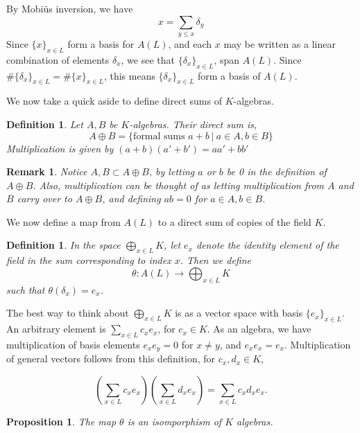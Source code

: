 \documentclass[11pt]{article}
\newtheorem{proposition}[theorem]{Proposition}
\newtheorem{definition}[theorem]{Definition}
\newtheorem{remark}[theorem]{Remark}
\begin{document}
By Mobi\"{u}s inversion, we have 
$$x=\sum_{y\le x} \delta_y$$
Since $\{x\}_{x\in L}$ form a basis for $A(L)$, and each $x$ may be written as a linear combination of elements $\delta_x$, we see that $\{\delta_x\}_{x\in L}$, span $A(L)$. Since $\#\{\delta_x\}_{x\in L}=\#\{x\}_{x\in L}$, this means $\{\delta_x\}_{x\in L}$ form a basis of $A(L)$. 

We now take a quick aside to define direct sums of $K$-algebras.

\begin{definition}
Let $A,B$ be $K$-algebras. Their direct sum is,
$$A\oplus B=\{\mbox{formal sums } a+b \: | \: a\in A, b \in B\}$$
Multiplication is given by $(a+b)(a'+b')=aa'+bb'$
\end{definition}

\begin{remark}
Notice $A,B\subset A\oplus B$, by letting $a$ or $b$ be 0 in the definition of $A\oplus B$. Also, multiplication can be thought of as letting multiplication from $A$ and $B$ carry over to $A\oplus B$, and defining $ab=0$ for $a\in A, b\in B$.
\end{remark}

We now define a map from $A(L)$ to a direct sum of copies of the field $K$.

\begin{definition}
In the space $\bigoplus_{x\in L} K$, let $e_x$ denote the identity element of the field in the sum corresponding to index $x$. Then we define 
$$\theta: A(L) \rightarrow \bigoplus_{x\in L} K$$
such that $\theta(\delta_x)=e_x$.
\end{definition}

The best way to think about $\bigoplus_{x\in L} K$ is as a vector space with basis $\{e_x\}_{x\in L}$. An arbitrary element is $\sum_{x \in L} c_x e_x$, for $c_x\in K$. As an algebra, we have multiplication of basis elements $e_xe_y=0$ for $x\ne y$, and $e_xe_x=e_x$. Multiplication of general vectors follows from this definition, for $c_x, d_x \in K$,

$$\left(\sum_{x\in L} c_xe_x\right)\left(\sum_{x\in L} d_xe_x\right)=\sum_{x\in L} c_xd_xe_x.$$

\begin{proposition}\label{iso}
The map $\theta$ is an isomporphism of $K$ algebras.
\end{proposition}
\end{document}
